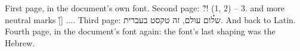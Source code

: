 \documentclass{article}
\begin{document}
First page, in the document's own font.
\newpage
Second page: {\h ?! (1, 2) -- 3.} and more neutral marks {\h [] ...}.
\newpage
Third page: {\h שלום עולם, זה טקסט בעברית.} And back to Latin.
\newpage
Fourth page, in the document's font again: the font's last shaping was
the Hebrew.
\end{document}
